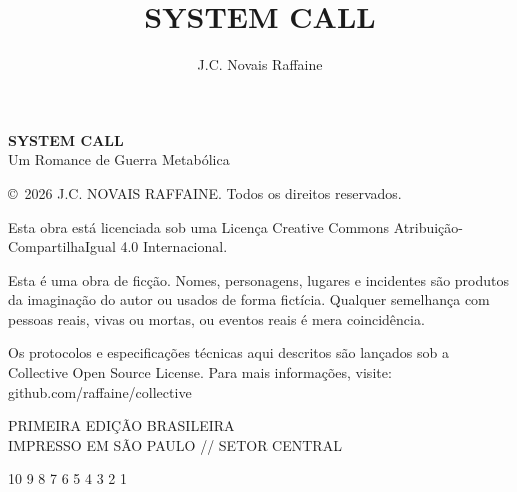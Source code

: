 \documentclass[11pt, openany]{book}
\title{\headerfont\Huge\textbf{SYSTEM CALL}}
\author{\headerfont J.C. Novais Raffaine}
\date{}
\begin{document}


\newpage
\thispagestyle{empty}
\vspace*{\fill}

\begin{flushleft}
    {\headerfont\large\textbf{SYSTEM CALL}} \\
    {\headerfont\small Um Romance de Guerra Metabólica} \\ %
    \vspace{2ex}
    
    {\small \copyright\ 2026 J.C. NOVAIS RAFFAINE. Todos os direitos reservados.} \\ %
    \vspace{2ex}
    
    {\small Esta obra está licenciada sob uma Licença Creative Commons Atribuição-CompartilhaIgual 4.0 Internacional.} \\
    \vspace{2ex}

    {\footnotesize 
    Esta é uma obra de ficção.
    Nomes, personagens, lugares e incidentes são produtos da imaginação do autor ou usados de forma fictícia.
    Qualquer semelhança com pessoas reais, vivas ou mortas, ou eventos reais é mera coincidência. \\
    \vspace{1ex}
    
    Os protocolos e especificações técnicas aqui descritos são lançados sob a Collective Open Source License. 
    Para mais informações, visite: \\
    \headerfont\color{collectiveBlue} github.com/raffaine/collective
    }
    
    \vspace{4ex}
    
    {\headerfont\scriptsize PRIMEIRA EDIÇÃO BRASILEIRA} \\ %
    {\headerfont\scriptsize IMPRESSO EM SÃO PAULO // SETOR CENTRAL} \\ %
    \vspace{2ex}
    
    {\headerfont\tiny 10 9 8 7 6 5 4 3 2 1}
\end{flushleft}
\vspace{2ex}

\frontmatter
\maketitle
\tableofcontents

\mainmatter














\appendix


\end{document}
